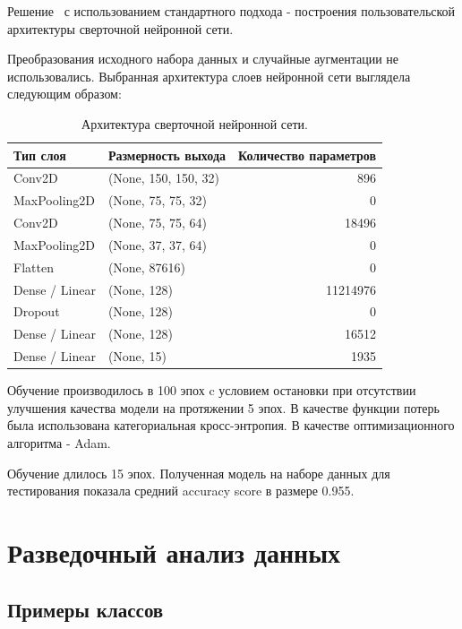 \documentclass[a4paper,12pt]{extarticle}
\begin{document}
Решение~\cite{example_3} с использованием стандартного подхода - построения пользовательской архитектуры сверточной
нейронной сети.\par

Преобразования исходного набора данных и случайные аугментации не использовались. Выбранная
архитектура слоев нейронной сети выглядела следующим образом:

\begin{table}[ht]
	\caption{Архитектура сверточной нейронной сети.}
	\label{table:example_3_arch}
	\footnotesize
	\centering
	\begin{tabular}{ |l|l|r| }
		\hline
		Тип слоя & Размерность выхода & Количество параметров \\ [0.5ex]
		\hline\hline
		Conv2D & (None, 150, 150, 32) & 896 \\
		\hline
		MaxPooling2D & (None, 75, 75, 32) & 0 \\
		\hline
		Conv2D & (None, 75, 75, 64) & 18496 \\
		\hline
		MaxPooling2D & (None, 37, 37, 64) & 0 \\
		\hline
		Flatten & (None, 87616) & 0 \\
		\hline
		Dense / Linear & (None, 128) & 11214976 \\
		\hline
		Dropout & (None, 128) & 0 \\
		\hline
		Dense / Linear & (None, 128) & 16512 \\
		\hline
		Dense / Linear & (None, 15) & 1935 \\
		\hline
	\end{tabular}
\end{table}

Обучение производилось в 100 эпох c условием остановки при отсутствии улучшения качества модели на
протяжении 5 эпох. В качестве функции потерь была использована категориальная кросс-энтропия.
В качестве оптимизационного алгоритма - Adam.\par

Обучение длилось 15 эпох. Полученная модель на наборе данных для тестирования показала средний
accuracy score в размере 0.955.

\newpage
\section{Разведочный анализ данных}

\subsection{Примеры классов}
\end{document}
